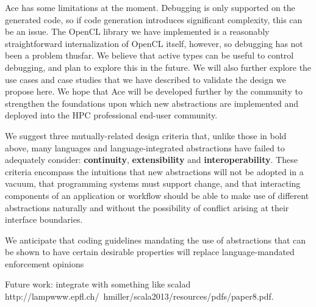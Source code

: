 \documentclass[9pt,preprint]{sigplanconf}
\begin{document}
Ace has some limitations at the moment. Debugging is only supported on the generated code, so if code generation introduces significant complexity, this can be an issue. The OpenCL library we have implemented is a reasonably straightforward internalization of OpenCL itself, however, so debugging has not been a problem thusfar. We believe that active types can be useful to control debugging, and plan to explore this in the future. We will also further explore the use cases and case studies that we have described to validate the design we propose here. We hope that Ace will be developed further by the community to strengthen the foundations upon which new abstractions are implemented and deployed into the HPC professional end-user community.

We suggest three mutually-related {design criteria} that, unlike those in bold above, many languages and language-integrated abstractions have failed to adequately consider: \textbf{continuity}, \textbf{extensibility} and \textbf{interoperability}. These criteria encompass the intuitions that new abstractions will not be adopted in a vacuum, that programming systems must  support change, and that interacting components of an application or workflow should be able to make use of different abstractions naturally and without the possibility of conflict arising at their interface boundaries.


 We anticipate that coding guidelines mandating the use of abstractions that can be shown to have certain desirable properties will replace language-mandated enforcement opinions 
 
 Future work: integrate with something like scalad http://lampwww.epfl.ch/~hmiller/scala2013/resources/pdfs/paper8.pdf. 







\end{document}
